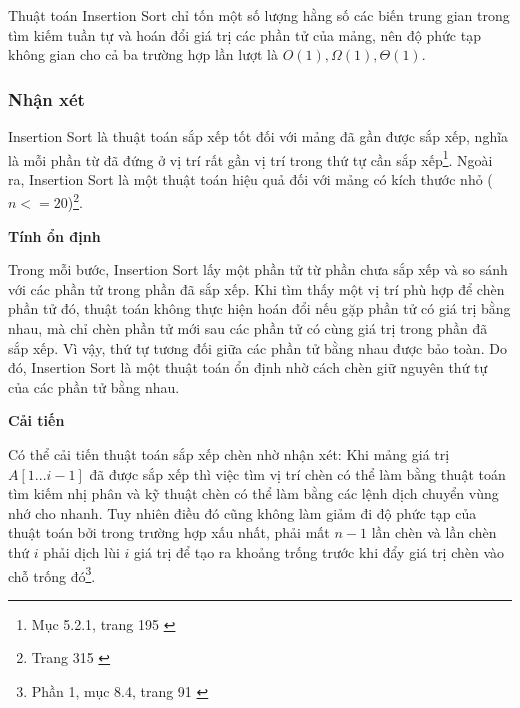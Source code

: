 Thuật toán Insertion Sort chỉ tốn một số lượng hằng số các biến trung gian trong tìm kiếm tuần tự và hoán đổi giá trị các phần tử của mảng, nên độ phức tạp không gian cho cả ba trường hợp lần lượt là $O(1), \Omega(1), \Theta(1)$.


\subsubsection{Nhận xét}

Insertion Sort là thuật toán sắp xếp tốt đối với mảng đã gần được sắp xếp, nghĩa là mỗi phần từ đã đứng ở vị trí rất gần vị trí trong thứ tự cần sắp xếp\footnote{Mục 5.2.1, trang 195 \cite{dsa_nghia_2013}}. Ngoài ra, Insertion Sort là một thuật toán hiệu quả đối với mảng có kích thước nhỏ ($n <=20$)\footnote{Trang 315 \cite{dsa-analysis-cpp}}.

\textbf{Tính ổn định}

Trong mỗi bước, Insertion Sort lấy một phần tử từ phần chưa sắp xếp và so sánh với các phần tử trong phần đã sắp xếp. Khi tìm thấy một vị trí phù hợp để chèn phần tử đó, thuật toán không thực hiện hoán đổi nếu gặp phần tử có giá trị bằng nhau, mà chỉ chèn phần tử mới sau các phần tử có cùng giá trị trong phần đã sắp xếp. Vì vậy, thứ tự tương đối giữa các phần tử bằng nhau được bảo toàn.
Do đó, Insertion Sort là một thuật toán ổn định nhờ cách chèn giữ nguyên thứ tự của các phần tử bằng nhau. 

\textbf{Cải tiến}

 Có thể cải tiến thuật toán sắp xếp chèn nhờ nhận xét: Khi mảng giá trị $A[1...i-1]$ đã được sắp xếp thì việc tìm vị trí chèn có thể làm bằng thuật toán tìm kiếm nhị phân và kỹ thuật chèn có thể làm bằng các lệnh dịch chuyển vùng nhớ cho nhanh. Tuy nhiên điều đó cũng không làm giảm đi độ phức tạp của thuật toán bởi trong trường hợp xấu nhất, phải mất $n - 1$ lần chèn và lần chèn thứ $i$ phải dịch lùi $i$ giá trị để tạo ra khoảng trống trước khi đẩy giá trị chèn vào chỗ trống đó\footnote{Phần 1, mục 8.4, trang 91 \cite{hoang1999giaithuat}}.


